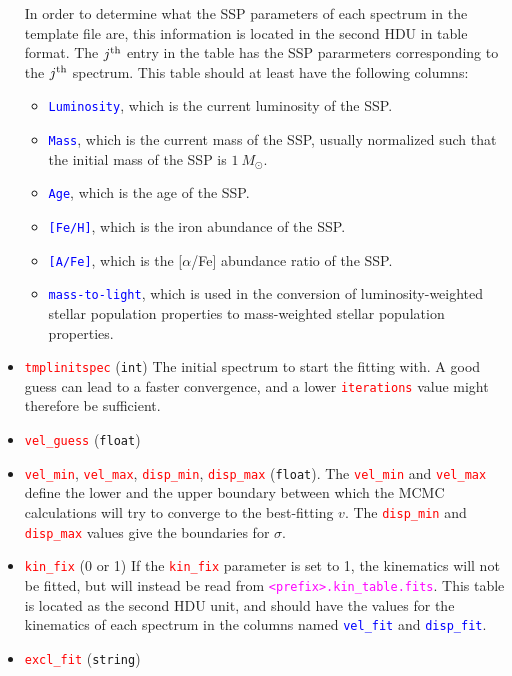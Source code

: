 \documentclass[usenatbib,usegraphicx,useAMS,onecolumn]{mn2e}
\newcommand{\codeline}[1]{\lstinline|#1|}
\newcommand{\paramdef}[1]{\textcolor{red}{\codeline{#1}}}
\newcommand{\tblcol}[1]{\textcolor{blue}{\codeline{#1}}}
\newcommand{\fname}[1]{\textcolor{magenta}{\codeline{#1}}}
\begin{document}
\begin{itemize}
        In order to determine what the SSP parameters of each spectrum in the template file are, this information is located in the second HDU in table format.
        The $j^{\rm th}$ entry in the table has the SSP pararmeters corresponding to the $j^{\rm th}$ spectrum.
        This table should at least have the following columns:
        \begin{itemize}
            \item \tblcol{Luminosity}, which is the current luminosity of the SSP.
            \item \tblcol{Mass}, which is the current mass of the SSP, usually normalized such that the initial mass of the SSP is $1~M_{\odot}$.
            \item \tblcol{Age}, which is the age of the SSP.
            \item \tblcol{[Fe/H]}, which is the iron abundance of the SSP.
            \item \tblcol{[A/Fe]}, which is the [$\alpha$/Fe] abundance ratio of the SSP.
            \item \tblcol{mass-to-light}, which is used in the conversion of luminosity-weighted stellar population properties to mass-weighted stellar population properties.
        \end{itemize}
    \item \paramdef{tmplinitspec} (\texttt{int}) The initial spectrum to start the fitting with.
        A good guess can lead to a faster convergence, and a lower \paramdef{iterations} value might therefore be sufficient.
    \item \paramdef{vel_guess} (\texttt{float}) 
    \item \paramdef{vel_min}, \paramdef{vel_max}, \paramdef{disp_min}, \paramdef{disp_max} (\texttt{float}).
        The \paramdef{vel_min} and \paramdef{vel_max} define the lower and the upper boundary between which the MCMC calculations will try to converge to the best-fitting $v$.
        The \paramdef{disp_min} and \paramdef{disp_max} values give the boundaries for $\sigma$.
    \item \paramdef{kin_fix} (0 or 1)
        If the \paramdef{kin_fix} parameter is set to 1, the kinematics will not be fitted, but will instead be read from \fname{<prefix>.kin_table.fits}.
        This table is located as the second HDU unit, and should have the values for the kinematics of each spectrum in the columns named \tblcol{vel_fit} and \tblcol{disp_fit}.
    \item \paramdef{excl_fit} (\texttt{string})

\end{itemize}
\end{document}
